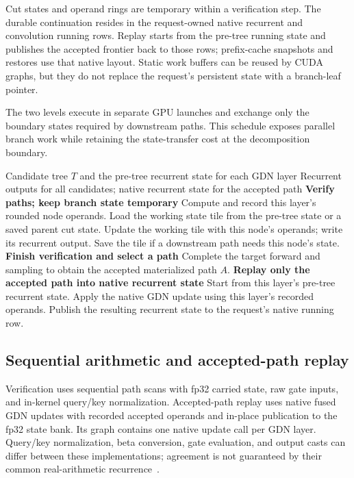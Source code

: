 \documentclass[conference]{IEEEtran}
\begin{document}
Cut states and operand rings are temporary within a verification step. The durable continuation resides in the request-owned native recurrent and convolution running rows. Replay starts from the pre-tree running state and publishes the accepted frontier back to those rows; prefix-cache snapshots and restores use that native layout. Static work buffers can be reused by CUDA graphs, but they do not replace the request's persistent state with a branch-leaf pointer.

The two levels execute in separate GPU launches and exchange only the boundary states required by downstream paths. This schedule exposes parallel branch work while retaining the state-transfer cost at the decomposition boundary.

\begin{algorithm*}[t]
\caption{Path-parallel scan and accepted-path replay}
\label{alg:scan-replay}
\normalsize\linespread{1.08}\selectfont\raggedright
\begin{algorithmic}[1]
\Require Candidate tree $T$ and the pre-tree recurrent state for each GDN layer
\Ensure Recurrent outputs for all candidates; native recurrent state for the accepted path
\Statex \textbf{Verify paths; keep branch state temporary}
  \State Compute and record this layer's rounded node operands.
      \State Load the working state tile from the pre-tree state or a saved parent cut state.
        \State Update the working tile with this node's operands; write its recurrent output.
        \State Save the tile if a downstream path needs this node's state.
      \EndFor
    \EndParallelFor
  \EndFor
\EndFor
\Statex \textbf{Finish verification and select a path}
\State Complete the target forward and sampling to obtain the accepted materialized path $A$.
\Statex \textbf{Replay only the accepted path into native recurrent state}
  \State Start from this layer's pre-tree recurrent state.
    \State Apply the native GDN update using this layer's recorded operands.
  \EndFor
  \State Publish the resulting recurrent state to the request's native running row.
\EndFor
\end{algorithmic}
\end{algorithm*}

\subsection{Sequential arithmetic and accepted-path replay}
Verification uses sequential path scans with fp32 carried state, raw gate inputs, and in-kernel query/key normalization. Accepted-path replay uses native fused GDN updates with recorded accepted operands and in-place publication to the fp32 state bank. Its graph contains one native update call per GDN layer. Query/key normalization, beta conversion, gate evaluation, and output casts can differ between these implementations; agreement is not guaranteed by their common real-arithmetic recurrence~\cite{lumo2026archive}.
\end{document}
